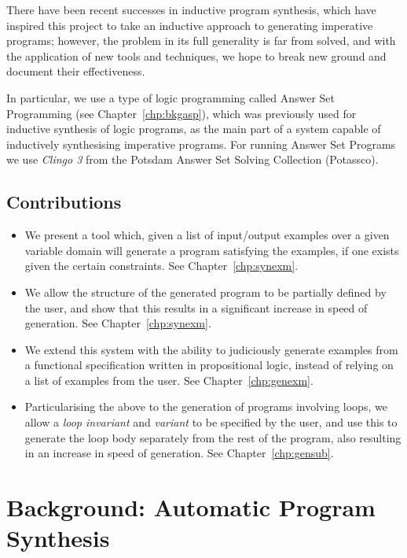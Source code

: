 \documentclass[a4paper,twoside,notitlepage]{report}
\begin{document}
There have been recent successes in inductive program synthesis\cite{tds}, 
which have inspired this project to take an inductive approach to generating 
imperative programs; however, the problem in its full generality is far from 
solved, and with the application of new tools and techniques, we hope to break 
new ground and document their effectiveness.

In particular, we use a type of logic programming called Answer Set 
Programming (see Chapter~\ref{chp:bkgasp}), which was previously used for 
inductive synthesis of logic programs, as the main part of a system 
capable of inductively synthesising imperative programs. For running 
Answer Set Programs we use \emph{Clingo 3} from the Potsdam Answer Set 
Solving Collection (Potassco)\cite{potassco}.

\section{Contributions}
\begin{itemize}
    \item We present a tool which, given a list of input/output examples 
    over a given variable domain will generate a program satisfying the
    examples, if one exists given the certain constraints. See 
    Chapter~\ref{chp:synexm}.

    \item We allow the structure of the generated program to be partially 
    defined by the user, and show that this results in a significant increase
    in speed of generation. See Chapter~\ref{chp:synexm}.

    \item We extend this system with the ability to judiciously generate 
    examples from a functional specification written in propositional
    logic, instead of relying on a list of examples from the user. See
    Chapter~\ref{chp:genexm}.

    \item Particularising the above to the generation of programs 
    involving loops, we allow a \emph{loop invariant} and \emph{variant}
    to be specified by the user, and use this to generate the loop body
    separately from the rest of the program, also resulting in an 
    increase in speed of generation. See Chapter~\ref{chp:gensub}.
\end{itemize}

\chapter{Background: Automatic Program Synthesis} \label{chp:bkgsyn}
\end{document}
